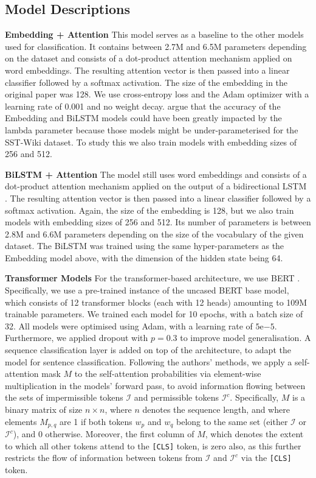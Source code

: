 \subsection{Model Descriptions}
\textbf{Embedding + Attention} This model serves as a baseline to the other models used for classification. It contains between 2.7M and 6.5M parameters depending on the dataset and consists of a dot-product attention mechanism applied on word embeddings. The resulting attention vector is then passed into a linear classifier followed by a softmax activation. The size of the embedding in the original paper was 128. We use cross-entropy loss and the Adam optimizer with a learning rate of 0.001 and no weight decay. \citet{pruthi-etal-2020-learning} argue that the accuracy of the Embedding and BiLSTM models could have been greatly impacted by the lambda parameter because those models might be under-parameterised for the SST-Wiki dataset. To study this we also train models with embedding sizes of 256 and 512.

\textbf{BiLSTM + Attention} The model still uses word embeddings and consists of a dot-product attention mechanism applied on the output of a bidirectional LSTM \citep{bilstm}. The resulting attention vector is then passed into a linear classifier followed by a softmax activation. Again, the size of the embedding is 128, but we also train models with embedding sizes of 256 and 512. Its number of parameters is between 2.8M and 6.6M parameters depending on the size of the vocabulary of the given dataset. The BiLSTM was trained using the same hyper-parameters as the Embedding model above, with the dimension of the hidden state being 64.

\textbf{Transformer Models} For the transformer-based architecture, we use BERT \citep{devlin2018bert}. Specifically, we use a pre-trained instance of the uncased BERT base model, which consists of 12 transformer blocks (each with 12 heads) amounting to 109M trainable parameters. We trained each model for 10 epochs, with a batch size of 32. All models were optimised using Adam, with a learning rate of $5\mathrm{e}{-5}$. Furthermore, we applied dropout with $p = 0.3$ to improve model generalisation. A sequence classification layer is added on top of the architecture, to adapt the model for sentence classification. Following the authors' methods, we apply a self-attention mask $M$ to the self-attention probabilities via element-wise multiplication in the models' forward pass, to avoid information flowing between the sets of impermissible tokens $\mathcal{I}$ and permissible tokens $\mathcal{I}^c$. Specifically, $M$ is a binary matrix of size $n \times n$, where $n$ denotes the sequence length, and where elements $M_{p,q}$ are 1 if both tokens $w_p$ and $w_q$ belong to the same set (either $\mathcal{I}$ or $\mathcal{I}^c$), and 0 otherwise. Moreover, the first column of $M$, which denotes the extent to which all other tokens attend to the \texttt{[CLS]} token, is zero also, as this further restricts the flow of information between tokens from $\mathcal{I}$ and $\mathcal{I}^c$ via the \texttt{[CLS]} token.

